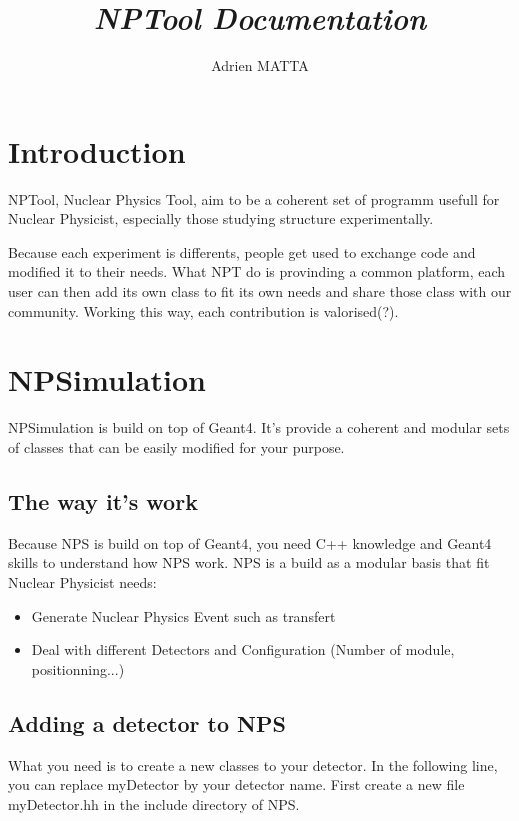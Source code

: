 \documentclass[a4paper,12pt]{article}
\begin{document}
\title{\emph{NPTool Documentation}}
\author{Adrien MATTA}

\maketitle 
\pagebreak
\tableofcontents %
\pagebreak


\section {Introduction}

NPTool, Nuclear Physics Tool, aim to be a coherent set of programm usefull for Nuclear Physicist, especially those studying structure experimentally.

Because each experiment is differents, people get used to exchange code and modified it to their needs. What NPT do is provinding a common platform, each user can then add its own class to fit its own needs and share those class with our community. Working this way, each contribution is valorised(?).

\section{NPSimulation}

NPSimulation is build on top of Geant4. It's provide a coherent and modular sets of classes that can be easily modified for your purpose.

\subsection{ The way it's work }

Because NPS is build on top of Geant4,  you need C++ knowledge and Geant4 skills to understand how NPS work. NPS is a build as a modular basis that fit Nuclear Physicist needs: 
\begin{itemize}
	\item Generate Nuclear Physics Event such as transfert
	\item Deal with different Detectors and Configuration (Number of module, positionning...)
\end{itemize}

 
\subsection{ Adding a detector to NPS }

What you need is to create a new classes to your detector. In the following line, you can replace myDetector by your detector name. First create a new file myDetector.hh in the include directory of NPS.
\end{document}

